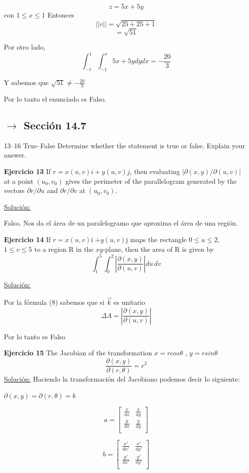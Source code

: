 \documentclass{report}
\newcommand{\s}{\underline{Soluci\'{o}n:}}
\begin{document}
	\[ z = 5x + 5y \] con $ 1 \leq x \leq 1 $
	Entonces \[||v|| = \sqrt{25+25+1} \]
	\[      = \sqrt{51} \]
	
	Por otro lado,
	\[ \int_{-1}^{1} \int_{-1}^{x}  5x + 5y dydx  = -\frac{20}{3}\]
	
	Y sabemos que $ \sqrt{51} \neq -\frac{20}{3}$
	
	Por lo tanto el enunciado es Falso.
	\subsection*{$\rightarrow$ Secci\'{o}n 14.7}
	
	13–16 True–False Determine whether the statement is true or false. Explain your answer. 
	
	\textbf{Ejercicio 13}
	If $r = x(u, v)i + y(u, v)j$, then evaluating $|\partial(x, y)/\partial(u, v)|$
	at a point $(u_0, v_0)$ gives the perimeter of the parallelogram
	generated by the vectors $\partial r/\partial u$ and $\partial r/\partial v$ at $(u_0, v_0)$.
	
	\s 
	
	Falso. Nos da el \'{a}rea de un paralelogramo que aproxima el \'{a}rea de una regi\'{o}n.
	
	
	\textbf{Ejercicio 14} If $r = x(u, v)$i $+ y(u, v)$j maps the rectangle $0 \leq u \leq  2$, $1 \leq v \leq 5$ to a region R in the $xy$-plane, then the area of R is given by
	\[\int_{1}^{5}\int_{0}^{2}\left|\frac{\partial\left(x, y \right)}{\partial\left(u, v \right)}\right| du \, dv \]
	
	\s 
	
	Por la f\'{o}rmula (8) sabemos que si $\vec{k}$ es unitario 
	\[\Delta A = \left|\frac{\partial (x, y)}{\partial(u,v)}\right|\]
	
	Por lo tanto es Falso
	
	\textbf{Ejercicio 15} 
	The Jacobian of the transformation $x = rcos\theta$ , $y = rsin\theta$
	\[\frac{\partial(x,y)}{\partial(r, \theta)} = r^2 \]
	\s
	Haciendo la transformación del Jacobiano podemos decir lo siguiente:
	
	$\partial(x,y) = \partial(r, \theta) = b $
	
	
	\[a =  \begin{bmatrix}
	\frac{x}{dx} & \frac{x}{dy}  \\
	\frac{y}{dx} & \frac{y}{dy} \\
	\end{bmatrix} \]
	
	
	
	\[ b = \begin{bmatrix}
	\frac{x'}{dx'} & \frac{x'}{dy'}  \\
	\frac{y'}{dx'} & \frac{y'}{dy'} \\
	\end{bmatrix} \]
	
\end{document}
